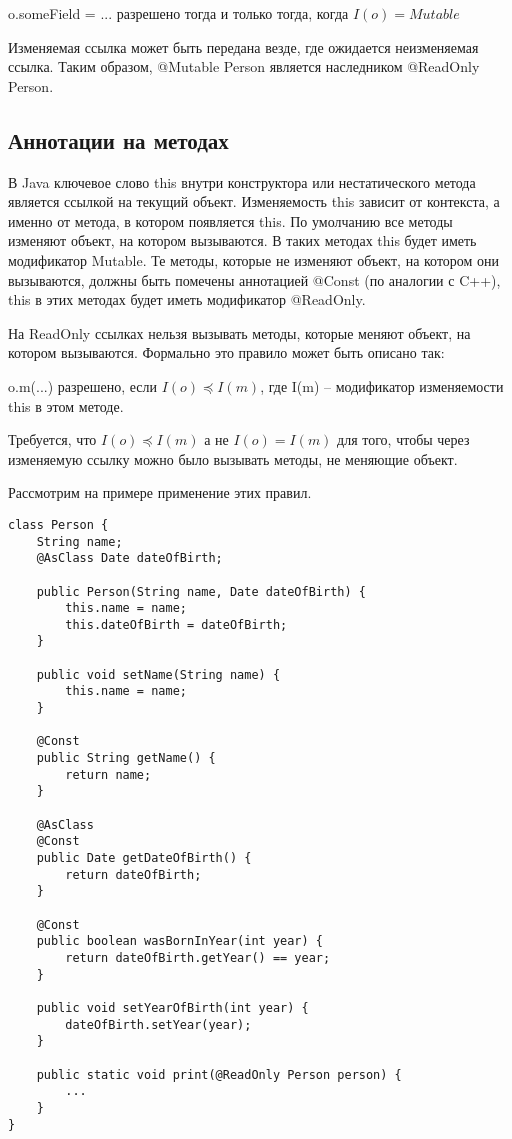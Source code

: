 \begin{Rule}\label{rule:assign_field}
o.someField = ... разрешено тогда и только тогда, когда $I(o) = Mutable$ 
\end{Rule}

Изменяемая ссылка может быть передана везде, где ожидается неизменяемая ссылка. Таким образом, @Mutable Person является наследником @ReadOnly Person.

\subsection{Аннотации на методах}

В Java ключевое слово this внутри конструктора или нестатического метода является ссылкой на текущий объект.  Изменяемость this зависит от контекста, а именно от метода, в котором появляется this. По умолчанию все методы изменяют объект, на котором вызываются. В таких методах this будет иметь модификатор Mutable. Те методы, которые не изменяют объект, на котором они вызываются, должны быть помечены аннотацией @Const (по аналогии с C++), this в этих методах будет иметь модификатор @ReadOnly.

На ReadOnly ссылках нельзя вызывать методы, которые меняют объект, на котором вызываются. Формально это правило может быть описано так:

\begin{Rule}\label{rule:invoke_method}
o.m(...) разрешено, если $I(o) \preceq I(m)$, где I(m) -- модификатор изменяемости this в этом методе.
\end{Rule}

Требуется, что $I(o) \preceq I(m)$ а не $I(o) = I(m)$ для того, чтобы через изменяемую ссылку можно было вызывать методы, не меняющие объект. 

Рассмотрим на примере применение этих правил.

\begin{lstlisting}[caption=Аннотации на методах, label=code:method_annotations]
class Person {
    String name;
    @AsClass Date dateOfBirth;	
    
    public Person(String name, Date dateOfBirth) {
    	this.name = name;
    	this.dateOfBirth = dateOfBirth;
    }
    
    public void setName(String name) {
        this.name = name;
    }
    
    @Const
    public String getName() {
        return name;
    }
    
    @AsClass
    @Const
    public Date getDateOfBirth() {
        return dateOfBirth;
    }
    
    @Const 
    public boolean wasBornInYear(int year) {
    	return dateOfBirth.getYear() == year;
    }
    
    public void setYearOfBirth(int year) {
        dateOfBirth.setYear(year);
    }
    
    public static void print(@ReadOnly Person person) {
        ...
    }
}
\end{lstlisting} 

